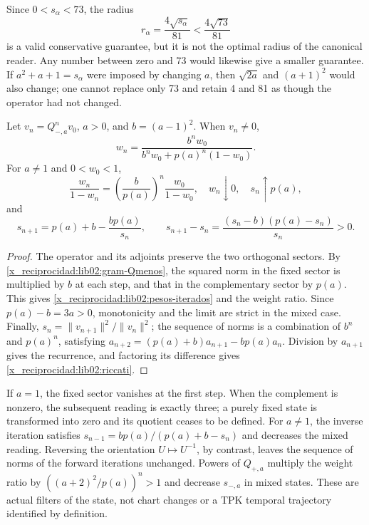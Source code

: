 Since \(0<s_\alpha<73\), the radius
\[
 r_\alpha=\frac{4\sqrt{s_\alpha}}{81}<\frac{4\sqrt{73}}{81}
\]
is a valid conservative guarantee, but it is not the optimal radius of the canonical reader. Any number between zero and 73 would likewise give a smaller guarantee. If \(a^2+a+1=s_\alpha\) were imposed by changing \(a\), then \(\sqrt{2a}\) and \((a+1)^2\) would also change; one cannot replace only 73 and retain 4 and 81 as though the operator had not changed.

\begin{theorem}
\label{x_reciprocidad:lib02:iteraciones}
Let \(v_n=Q_{-,a}^nv_0\), \(a>0\), and \(b=(a-1)^2\). When \(v_n\ne0\),
\begin{equation}
 w_n=\frac{b^nw_0}{b^nw_0+p(a)^n(1-w_0)}.
 \label{x_reciprocidad:lib02:pesos-iterados}
\end{equation}
For \(a\ne1\) and \(0<w_0<1\),
\[
 \frac{w_n}{1-w_n}
 =\left(\frac b{p(a)}\right)^n\frac{w_0}{1-w_0},
 \quad w_n\downarrow0,\quad s_n\uparrow p(a),
\]
and
\begin{equation}
 s_{n+1}=p(a)+b-\frac{bp(a)}{s_n},\qquad
 s_{n+1}-s_n=\frac{(s_n-b)(p(a)-s_n)}{s_n}>0.
 \label{x_reciprocidad:lib02:riccati}
\end{equation}
\end{theorem}
\begin{proof}
The operator and its adjoints preserve the two orthogonal sectors. By \eqref{x_reciprocidad:lib02:gram-Qmenos}, the squared norm in the fixed sector is multiplied by \(b\) at each step, and that in the complementary sector by \(p(a)\). This gives \eqref{x_reciprocidad:lib02:pesos-iterados} and the weight ratio. Since \(p(a)-b=3a>0\), monotonicity and the limit are strict in the mixed case. Finally, \(s_n=\|v_{n+1}\|^2/\|v_n\|^2\); the sequence of norms is a combination of \(b^n\) and \(p(a)^n\), satisfying \(a_{n+2}=(p(a)+b)a_{n+1}-bp(a)a_n\). Division by \(a_{n+1}\) gives the recurrence, and factoring its difference gives \eqref{x_reciprocidad:lib02:riccati}.
\end{proof}

If \(a=1\), the fixed sector vanishes at the first step. When the
complement is nonzero, the subsequent reading is exactly three;
a purely fixed state is transformed into zero and its quotient ceases to
be defined. For \(a\ne1\), the inverse iteration satisfies
\(s_{n-1}=bp(a)/(p(a)+b-s_n)\) and decreases the mixed reading.
Reversing the orientation \(U\mapsto U^{-1}\), by contrast, leaves
the sequence of norms of the forward iterations unchanged.
Powers of \(Q_{+,a}\) multiply the weight ratio by
\(((a+2)^2/p(a))^n>1\) and decrease \(s_{-,a}\) in mixed
states. These are actual filters of the state, not chart changes or a
TPK temporal trajectory identified by definition.

